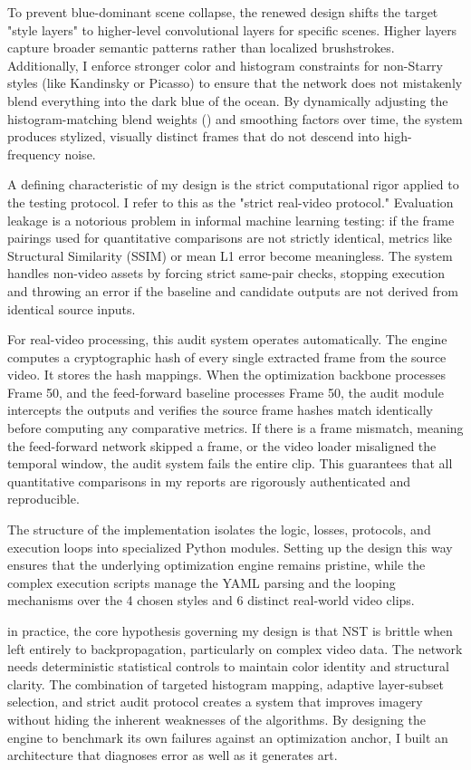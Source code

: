 \documentclass[12pt,letterpaper]{article}
\begin{document}
To prevent blue-dominant scene collapse, the renewed design shifts the target "style layers" to higher-level convolutional layers for specific scenes. Higher layers capture broader semantic patterns rather than localized brushstrokes. Additionally, I enforce stronger color and histogram constraints for non-Starry styles (like Kandinsky or Picasso) to ensure that the network does not mistakenly blend everything into the dark blue of the ocean. By dynamically adjusting the histogram-matching blend weights () and smoothing factors over time, the system produces stylized, visually distinct frames that do not descend into high-frequency noise.

A defining characteristic of my design is the strict computational rigor applied to the testing protocol. I refer to this as the "strict real-video protocol." Evaluation leakage is a notorious problem in informal machine learning testing: if the frame pairings used for quantitative comparisons are not strictly identical, metrics like Structural Similarity (SSIM) or mean L1 error become meaningless. The system handles non-video assets by forcing strict same-pair checks, stopping execution and throwing an error if the baseline and candidate outputs are not derived from identical source inputs.

For real-video processing, this audit system operates automatically. The engine computes a cryptographic hash of every single extracted frame from the source video. It stores the hash mappings. When the optimization backbone processes Frame 50, and the feed-forward baseline processes Frame 50, the audit module intercepts the outputs and verifies the source frame hashes match identically before computing any comparative metrics. If there is a frame mismatch, meaning the feed-forward network skipped a frame, or the video loader misaligned the temporal window, the audit system fails the entire clip. This guarantees that all quantitative comparisons in my reports are rigorously authenticated and reproducible.

The structure of the implementation isolates the logic, losses, protocols, and execution loops into specialized Python modules. Setting up the design this way ensures that the underlying optimization engine  remains pristine, while the complex execution scripts manage the YAML parsing and the looping mechanisms over the 4 chosen styles and 6 distinct real-world video clips.

in practice, the core hypothesis governing my design is that NST is brittle when left entirely to backpropagation, particularly on complex video data. The network needs deterministic statistical controls to maintain color identity and structural clarity. The combination of targeted histogram mapping, adaptive layer-subset selection, and strict audit protocol creates a system that improves imagery without hiding the inherent weaknesses of the algorithms. By designing the engine to benchmark its own failures against an optimization anchor, I built an architecture that diagnoses error as well as it generates art.
\end{document}
